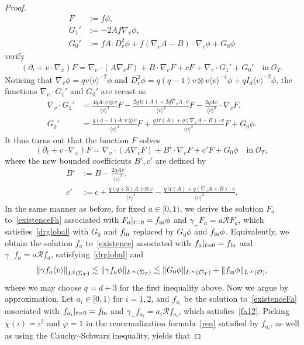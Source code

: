 \documentclass[10pt]{amsart}
\theoremstyle{definition}\newtheorem{defi}[theo]{Definition}\newtheorem{rema}[theo]{Remark}\newtheorem{exam}[theo]{Example}\newtheorem{exem}[theo]{Example}\newtheorem{nota}[theo]{Notation}
\newcommand*\p{\partial}
\newcommand*\trace{\mathrm{tr}}
\newcommand*\fin {f_{\rm in}}
\newcommand*\RR {\mathcal{R}}
\newcommand*\OO {\mathcal{O}}
\newcommand{\la}{\langle}
\newcommand{\ra}{\rangle}
\begin{document}
\begin{proof}
\begin{align*}
F&:=f\phi,\\
G_1'&:= -2Af\nabla_v\phi,\\
G_0'&:= fA:D_v^2\phi + f\left(\nabla_vA-B\right)\cdot\nabla_v\phi +G_0\phi
\end{align*}
verify
\begin{align*}
\left(\p_t+v\cdot\nabla_x\right)F = \nabla_v\cdot\left(A\nabla_vF\right) +B\cdot\nabla_v F +cF +\nabla_v\cdot G_1' + G_0' \quad\text{in}\; \OO_T.
\end{align*}
Noticing that $\nabla_v\phi=qv\la v\ra^{-2}\phi$ and $D_v^2\phi=q(q-1)v\otimes v\la v\ra^{-4}\phi+qI_d\la v\ra^{-2}\phi$, the functions $\nabla_v\cdot G_1'$ and $G_0'$ are recast as
\begin{align*}
\nabla_v\cdot G_1'&= \frac{4qA:v\otimes v}{\la v\ra^4}F -\frac{2q\,\trace(A) + 2q\nabla_vA\cdot v}{\la v\ra^2}F - \frac{2qA v}{\la v\ra^2}\cdot\nabla_vF,\\
G_0'&= \frac{q(q-1)A:v\otimes v}{\la v\ra^4}F + \frac{q\,\trace(A)+q(\nabla_vA-B)\cdot v}{\la v\ra^2} F +G_0\phi.
\end{align*}
It thus turns out that the function $F$ solves
\begin{equation}\label{existenceFa}
\left(\p_t+v\cdot\nabla_x\right)F = \nabla_v\cdot\left(A\nabla_vF\right) +B'\cdot\nabla_v F +c'F +G_0\phi \quad\text{in}\; \OO_T,
\end{equation}
where the new bounded coefficients $B',c'$ are defined by
\begin{align*}
B'&:=B- \frac{2q A v}{\la v\ra^2},\\
c'&:=c+\frac{q(q+3)A:v\otimes v}{\la v\ra^4} -\frac{q\,\trace(A)+q(\nabla_vA+B)\cdot v}{\la v\ra^2}.
\end{align*}
In the same manner as before, for fixed $a\in[0,1)$, we derive the solution $F_a$ to~\eqref{existenceFa} associated with $F_a|_{t=0}=\fin\phi$ and $\gamma_-F_a=a\RR F_a$, which satisfies~\eqref{drglobal} with $G_0$ and $\fin$ replaced by $G_0\phi$ and $\fin\phi$. Equivalently, we obtain the solution $f_a$ to~\eqref{existence} associated with $f_a|_{t=0}=\fin$ and $\gamma_-f_a=a\RR f_a$, satisfying~\eqref{drglobal} and
\begin{equation}\label{fa12}
\left\|\gamma f_a\la v\ra\right\|_{L^2(\Sigma_T)}
\lesssim \|\gamma f_a\phi\|_{L^\infty(\Sigma_T)}
\lesssim \|G_0\phi\|_{L^\infty(\OO_T)} + \|\fin\phi\|_{L^\infty(\OO)},
\end{equation}
where we may choose $q=d+3$ for the first inequality above. Now we argue by approximation. Let $a_i\in[0,1)$ for $i=1,2$, and $f_{a_i}$ be the solution to~\eqref{existenceFa} associated with $f_{a_i}|_{t=0}=\fin$ and $\gamma_-f_{a_i}=a_i\RR f_{a_i}$, which satisfies~\eqref{fa12}. Picking $\chi(\iota)=\iota^2$ and $\varphi=1$ in the renormalization formula~\eqref{ren} satisfied by $f_{a_i}$, as well as using the Cauchy--Schwarz inequality, yields that

\end{proof}
\end{document}
